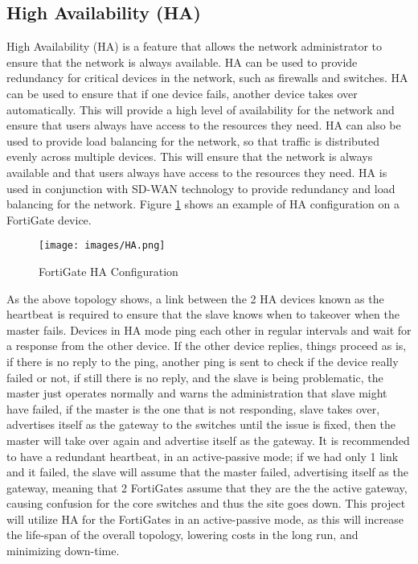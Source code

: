 \documentclass[12pt]{report}
\begin{document}
\subsection{High Availability (HA)}
High Availability (HA) is a feature that allows the network administrator to ensure that the network is always available. HA can be used to provide redundancy for critical devices in the network, such as firewalls and switches. HA can be used to ensure that if one device fails, another device takes over automatically. This will provide a high level of availability for the network and ensure that users always have access to the resources they need. HA can also be used to provide load balancing for the network, so that traffic is distributed evenly across multiple devices. This will ensure that the network is always available and that users always have access to the resources they need. HA is used in conjunction with SD-WAN technology to provide redundancy and load balancing for the network. Figure \ref{fig:HA} shows an example of HA configuration on a FortiGate device.
\begin{figure}[h]
    \centering
    \texttt{[image: images/HA.png]}
    \caption{FortiGate HA Configuration}
    \label{fig:HA}
\end{figure}

As the above topology shows, a link between the 2 HA devices known as the heartbeat is required to ensure that the slave knows when to takeover when the master fails. Devices in HA mode ping each other in regular intervals and wait for a response from the other device. If the other device replies, things proceed as is, if there is no reply to the ping, another ping is sent to check if the device really failed or not, if still there is no reply, and the slave is being problematic, the master just operates normally and warns the administration that slave might have failed, if the master is the one that is not responding, slave takes over, advertises itself as the gateway to the switches until the issue is fixed, then the master will take over again and advertise itself as the gateway. It is recommended to have a redundant heartbeat, in an active-passive mode; if we had only 1 link and it failed, the slave will assume that the master failed, advertising itself as the gateway, meaning that 2 FortiGates assume that they are the the active gateway, causing confusion for the core switches and thus the site goes down. This project will utilize HA for the FortiGates in an active-passive mode, as this will increase the life-span of the overall topology, lowering costs in the long run, and minimizing down-time. \cite{HA} \cite{HA2}
\end{document}
